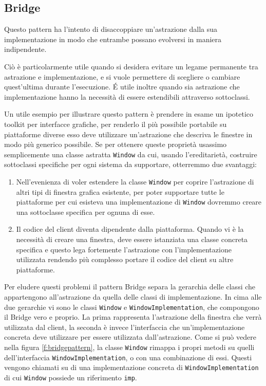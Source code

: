 \subsection{Bridge}
\label{sub:bridge}
Questo pattern ha l'intento di disaccoppiare un'astrazione dalla sua implementazione in modo che entrambe possano evolversi in maniera indipendente.

Ciò è particolarmente utile quando si desidera evitare un legame permanente tra astrazione e implementazione, e si vuole permettere di scegliere o cambiare quest'ultima durante l'esecuzione. É utile inoltre quando sia astrazione che implementazione hanno la necessità di essere estendibili attraverso sottoclassi. 

Un utile esempio per illustrare questo pattern è prendere in esame un ipotetico toolkit per interfacce grafiche, per renderlo il più possibile portabile su piattaforme diverse esso deve utilizzare un'astrazione che descriva le finestre in modo più generico possibile. Se per ottenere queste proprietà usassimo semplicemente una classe astratta \texttt{Window} da cui, usando l'ereditarietà, costruire sottoclassi specifiche per ogni sistema da supportare, otterremmo due svantaggi:
\begin{enumerate}
	\item Nell'evenienza di voler estendere la classe \texttt{Window} per coprire l'astrazione di altri tipi di finestra grafica esistente, per poter supportare tutte le piattaforme per cui esisteva una implementazione di \texttt{Window} dovremmo creare una sottoclasse specifica per ognuna di esse.
	\item Il codice del client diventa dipendente dalla piattaforma. Quando vi è la necessità di creare una finestra, deve essere istanziata una classe concreta specifica e questo lega fortemente l'astrazione con l'implementazione utilizzata rendendo più complesso portare il codice del client su altre piattaforme.
\end{enumerate}
Per eludere questi problemi il pattern Bridge separa la gerarchia delle classi che appartengono all'astrazione da quella delle classi di implementazione. In cima alle due gerarchie vi sono le classi \texttt{Window} e \texttt{WindowImplementation}, che compongono il Bridge vero e proprio. La prima rappresenta l'astrazione della finestra che verrà utilizzata dal client, la seconda è invece l'interfaccia che un'implementazione concreta deve utilizzare per essere utilizzata dall'astrazione.
Come si può vedere nella figura \ref{f:bridgepattern}, la classe \texttt{Window} rimappa i propri metodi su quelli dell'interfaccia \texttt{WindowImplementation}, o con una combinazione di essi. Questi vengono chiamati su di una implementazione concreta di \texttt{WindowImplementation} di cui \texttt{Window} possiede un riferimento \texttt{imp}.

